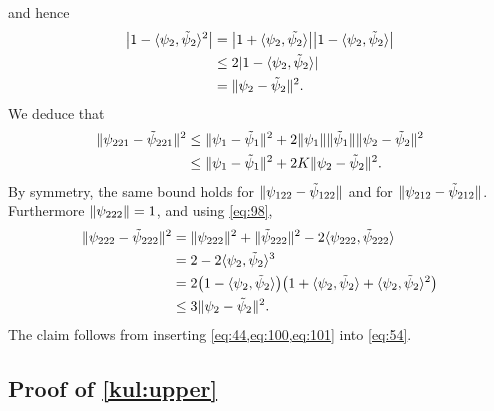 \documentclass[journal]{IEEEtran}
\newcommand{\1}{\boldsymbol{1}}
\DeclarePairedDelimiter{\Inner}{\langle}{\rangle}
\DeclarePairedDelimiter{\ip}{\langle}{\rangle}
\DeclarePairedDelimiter{\brackets}{(}{)}
\DeclarePairedDelimiter{\norm}{\lVert}{\rVert}
\DeclarePairedDelimiter{\abs}{\lvert}{\rvert}
\begin{document}
and hence
\begin{align*}
  \abs[\big]{1-\ip{\psi_2,\tilde{\psi}_2}^2}
  &= \abs[\big]{1+\ip{\psi_2,\tilde{\psi_2}}}\abs[\big]{1-\ip{\psi_2,\tilde{\psi}_2}}\\
  &\leq 2\abs{1-\ip{\psi_2,\tilde{\psi}_2}}\\
  &=\norm{\psi_2-\tilde{\psi}_2}^2.
\end{align*}
We deduce that
\begin{align}
	\norm{\psi_{221} - \tilde{\psi}_{221}}^2%
  &\leq \norm{\psi_1 - \tilde{\psi}_1}^2 + 2 \norm{\psi_1}\norm{\tilde{\psi}_1} \norm{\psi_2 - \tilde{\psi}_2}^2 \nonumber\\
  \label{eq:100}
  &\leq \norm{\psi_1 - \tilde{\psi}_1}^2+2K\norm{\psi_2-\tilde{\psi}_2}^2.
\end{align}
By symmetry, the same bound holds for $\norm{\psi_{122} - \tilde{\psi}_{122}}$ and for $\norm{\psi_{212}-\tilde{\psi}_{212}}$. Furthermore $\norm{\psi_{222}} = 1$, and using \eqref{eq:98},
\begin{align}
	\label{eq:101}
	\norm{\psi_{222} - \tilde{\psi}_{222}}^2%
	&= \norm{\psi_{222}}^2 + \norm{\tilde{\psi}_{222}}^2 - 2 \Inner{\psi_{222},\tilde{\psi}_{222}} \nonumber \\
	&= 2 - 2\Inner{\psi_2,\tilde{\psi}_2}^3 \nonumber \\
	&= 2\brackets[\big]{1-\ip{\psi_2,\tilde{\psi}_2}}\brackets[\big]{1+\ip{\psi_2,\tilde{\psi}_2}+\ip{\psi_2,\tilde{\psi}_2}^2}\nonumber \\
	&\leq 3\norm{\psi_2 - \tilde{\psi}_2}^2.
\end{align}
The claim follows from inserting \cref{eq:44,eq:100,eq:101} into \cref{eq:54}.

\subsection{Proof of \cref{kul:upper}}
\end{document}
